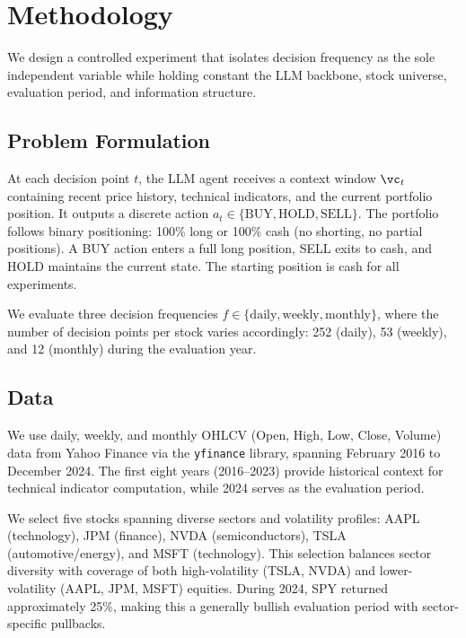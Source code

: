 \section{Methodology}
\label{sec:methodology}

We design a controlled experiment that isolates decision frequency as the sole independent variable while holding constant the LLM backbone, stock universe, evaluation period, and information structure.

\subsection{Problem Formulation}

At each decision point $t$, the LLM agent receives a context window $\vc_t$ containing recent price history, technical indicators, and the current portfolio position. It outputs a discrete action $a_t \in \{\text{BUY}, \text{HOLD}, \text{SELL}\}$. The portfolio follows binary positioning: 100\% long or 100\% cash (no shorting, no partial positions). A BUY action enters a full long position, SELL exits to cash, and HOLD maintains the current state. The starting position is cash for all experiments.

We evaluate three decision frequencies $f \in \{\text{daily}, \text{weekly}, \text{monthly}\}$, where the number of decision points per stock varies accordingly: 252 (daily), 53 (weekly), and 12 (monthly) during the evaluation year.

\subsection{Data}

We use daily, weekly, and monthly OHLCV (Open, High, Low, Close, Volume) data from Yahoo Finance via the \texttt{yfinance} library, spanning February 2016 to December 2024. The first eight years (2016--2023) provide historical context for technical indicator computation, while 2024 serves as the evaluation period.

We select five stocks spanning diverse sectors and volatility profiles: AAPL (technology), JPM (finance), NVDA (semiconductors), TSLA (automotive/energy), and MSFT (technology). This selection balances sector diversity with coverage of both high-volatility (TSLA, NVDA) and lower-volatility (AAPL, JPM, MSFT) equities. During 2024, SPY returned approximately 25\%, making this a generally bullish evaluation period with sector-specific pullbacks.

